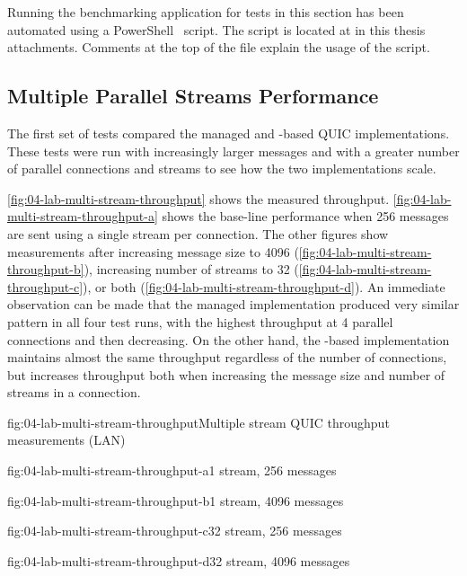 Running the benchmarking application for tests in this section has been automated using a
PowerShell~\cite{powershell} script. The script is located at
 in this thesis attachments. Comments
at the top of the file explain the usage of the script.

\subsection{Multiple Parallel Streams Performance}\label{sec:04-multi-stream-perf}

The first set of tests compared the managed and \libmsquic{}-based QUIC implementations. These tests
were run with increasingly larger messages and with a greater number of parallel connections and
streams to see how the two implementations scale.

\autoref{fig:04-lab-multi-stream-throughput} shows the measured throughput.
\autoref{fig:04-lab-multi-stream-throughput-a} shows the base-line performance when \SI{256}{\byte}
messages are sent using a single stream per connection. The other figures show measurements after
increasing message size to \SI{4096}{\byte} (\autoref{fig:04-lab-multi-stream-throughput-b}),
increasing number of streams to 32 (\autoref{fig:04-lab-multi-stream-throughput-c}), or both
(\autoref{fig:04-lab-multi-stream-throughput-d}). An immediate observation can be made that the
managed implementation produced very similar pattern in all four test runs, with the highest
throughput at 4 parallel connections and then decreasing. On the other hand, the \libmsquic{}-based
implementation maintains almost the same throughput regardless of the number of connections, but
increases throughput both when increasing the message size and number of streams in a connection.

\begin{myFigure}{fig:04-lab-multi-stream-throughput}{Multiple stream QUIC throughput measurements (LAN)}
\begin{mySubfigure}{0.49\linewidth}{fig:04-lab-multi-stream-throughput-a}{1 stream, \SI{256}{\byte} messages}
\footnotesize

\end{mySubfigure}
\begin{mySubfigure}{0.49\linewidth}{fig:04-lab-multi-stream-throughput-b}{1 stream, \SI{4096}{\byte} messages}
\footnotesize

\end{mySubfigure}

\begin{mySubfigure}{0.49\linewidth}{fig:04-lab-multi-stream-throughput-c}{32 stream, \SI{256}{\byte} messages}
\footnotesize

\end{mySubfigure}
\begin{mySubfigure}{0.49\linewidth}{fig:04-lab-multi-stream-throughput-d}{32 stream, \SI{4096}{\byte} messages}
\footnotesize

\end{mySubfigure}
\end{myFigure}

